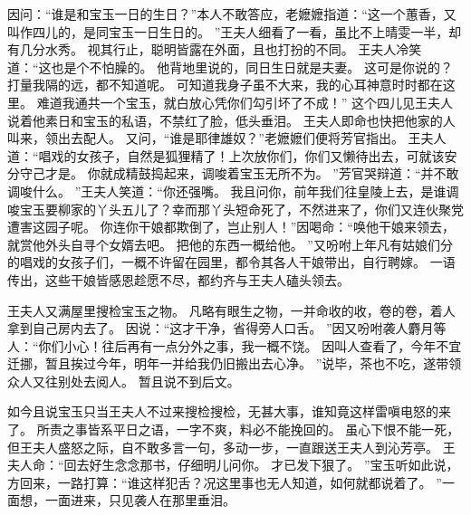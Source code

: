 因问：“谁是和宝玉一日的生日？”本人不敢答应，老嬷嬷指道：“这一个蕙香，又叫作四儿的，是同宝玉一日生日的。
”王夫人细看了一看，虽比不上晴雯一半，却有几分水秀。
视其行止，聪明皆露在外面，且也打扮的不同。
王夫人冷笑道：“这也是个不怕臊的。
他背地里说的，同日生日就是夫妻。
这可是你说的？打量我隔的远，都不知道呢。
可知道我身子虽不大来，我的心耳神意时时都在这里。
难道我通共一个宝玉，就白放心凭你们勾引坏了不成！”
这个四儿见王夫人说着他素日和宝玉的私语，不禁红了脸，低头垂泪。
王夫人即命也快把他家的人叫来，领出去配人。
又问，“谁是耶律雄奴？”老嬷嬷们便将芳官指出。
王夫人道：“唱戏的女孩子，自然是狐狸精了！上次放你们，你们又懒待出去，可就该安分守己才是。
你就成精鼓捣起来，调唆着宝玉无所不为。
”芳官哭辩道：“并不敢调唆什么。
”王夫人笑道：“你还强嘴。
我且问你，前年我们往皇陵上去，是谁调唆宝玉要柳家的丫头五儿了？幸而那丫头短命死了，不然进来了，你们又连伙聚党遭害这园子呢。
你连你干娘都欺倒了，岂止别人！”因喝命：“唤他干娘来领去，就赏他外头自寻个女婿去吧。
把他的东西一概给他。
”又吩咐上年凡有姑娘们分的唱戏的女孩子们，一概不许留在园里，都令其各人干娘带出，自行聘嫁。
一语传出，这些干娘皆感恩趁愿不尽，都约齐与王夫人磕头领去。
\par
王夫人又满屋里搜检宝玉之物。
凡略有眼生之物，一并命收的收，卷的卷，着人拿到自己房内去了。
因说：“这才干净，省得旁人口舌。
”因又吩咐袭人麝月等人：“你们小心！往后再有一点分外之事，我一概不饶。
因叫人查看了，今年不宜迁挪，暂且挨过今年，明年一并给我仍旧搬出去心净。
”说毕，茶也不吃，遂带领众人又往别处去阅人。
暂且说不到后文。
\par
如今且说宝玉只当王夫人不过来搜检搜检，无甚大事，谁知竟这样雷嗔电怒的来了。
所责之事皆系平日之语，一字不爽，料必不能挽回的。
虽心下恨不能一死，但王夫人盛怒之际，自不敢多言一句，多动一步，一直跟送王夫人到沁芳亭。
王夫人命：“回去好生念念那书，仔细明儿问你。
才已发下狠了。
”宝玉听如此说，方回来，一路打算：“谁这样犯舌？况这里事也无人知道，如何就都说着了。
”一面想，一面进来，只见袭人在那里垂泪。
